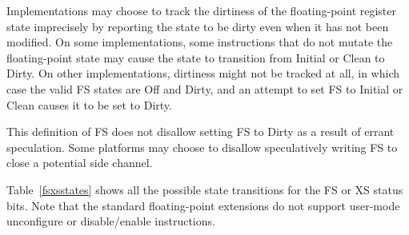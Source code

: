 Implementations may choose to track the dirtiness of the floating-point
register state imprecisely by reporting the state to be dirty even when
it has not been modified.  On some implementations, some instructions that
do not mutate the floating-point state may cause the state to transition from
Initial or Clean to Dirty.  On other implementations, dirtiness might not be
tracked at all, in which case the valid FS states are Off and Dirty, and an
attempt to set FS to Initial or Clean causes it to be set to Dirty.
\begin{commentary}
This definition of FS does not disallow setting FS to Dirty as a result of
errant speculation.  Some platforms may choose to disallow speculatively
writing FS to close a potential side channel.
\end{commentary}

Table~\ref{fsxsstates} shows all the possible state transitions for
the FS or XS status bits.  Note that the standard floating-point
extensions do not support user-mode unconfigure or disable/enable
instructions.

